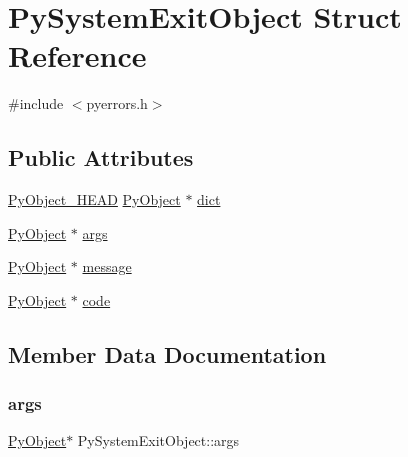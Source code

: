 \hypertarget{struct_py_system_exit_object}{}\section{Py\+System\+Exit\+Object Struct Reference}
\label{struct_py_system_exit_object}


{\ttfamily \#include $<$pyerrors.\+h$>$}

\subsection*{Public Attributes}
\begin{DoxyCompactItemize}
\item 
\mbox{\hyperlink{_python27_2object_8h_a0bf35c1f3ea13f925de94d8593db3b7e}{Py\+Object\+\_\+\+H\+E\+AD}} \mbox{\hyperlink{_python27_2object_8h_aadc84ac7aed2cfa6f20c25f62bf3dac7}{Py\+Object}} $\ast$ \mbox{\hyperlink{struct_py_system_exit_object_af813e336ff6727fccce5ba305adaf03d}{dict}}
\item 
\mbox{\hyperlink{_python27_2object_8h_aadc84ac7aed2cfa6f20c25f62bf3dac7}{Py\+Object}} $\ast$ \mbox{\hyperlink{struct_py_system_exit_object_a0587872bec1718f5d1f39e7593f0953b}{args}}
\item 
\mbox{\hyperlink{_python27_2object_8h_aadc84ac7aed2cfa6f20c25f62bf3dac7}{Py\+Object}} $\ast$ \mbox{\hyperlink{struct_py_system_exit_object_a1de85ccb4b5ea71dbeb918ff34e37792}{message}}
\item 
\mbox{\hyperlink{_python27_2object_8h_aadc84ac7aed2cfa6f20c25f62bf3dac7}{Py\+Object}} $\ast$ \mbox{\hyperlink{struct_py_system_exit_object_a24b939fdbc4152b8f08dcd2fc08cc08b}{code}}
\end{DoxyCompactItemize}


\subsection{Member Data Documentation}
\mbox{\label{struct_py_system_exit_object_a0587872bec1718f5d1f39e7593f0953b}} 
\subsubsection{\texorpdfstring{args}{args}}
{\footnotesize\ttfamily \mbox{\hyperlink{_python27_2object_8h_aadc84ac7aed2cfa6f20c25f62bf3dac7}{Py\+Object}}$\ast$ Py\+System\+Exit\+Object\+::args}

